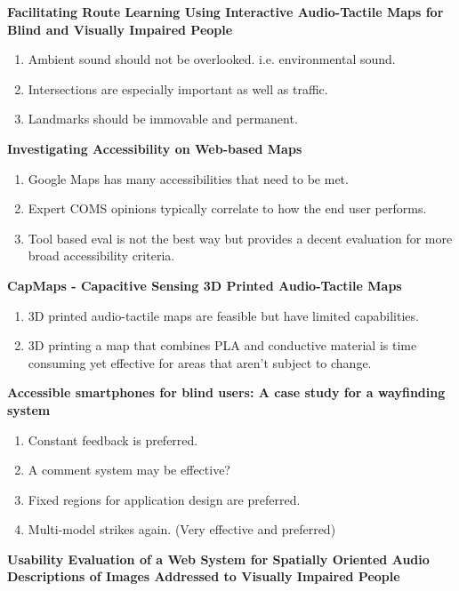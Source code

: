 \documentclass{article}
\begin{document}
\cite{} \textbf{Facilitating Route Learning Using Interactive Audio-Tactile Maps for Blind and Visually Impaired People } \cite{}

\begin{enumerate}
    \item Ambient sound should not be overlooked. i.e. environmental sound.
    \item Intersections are especially important as well as traffic. 
    \item Landmarks should be immovable and permanent. 
\end{enumerate}

\cite{} \textbf{Investigating Accessibility on Web-based Maps } \cite{}

\begin{enumerate}
    \item Google Maps has many accessibilities that need to be met. 
    \item Expert COMS opinions typically correlate to how the end user performs. 
    \item Tool based eval is not the best way but provides a decent evaluation for more broad accessibility criteria. 
\end{enumerate}

\cite{} \textbf{CapMaps - Capacitive Sensing 3D Printed Audio-Tactile Maps } \cite{}

\begin{enumerate}
    \item 3D printed audio-tactile maps are feasible but have limited capabilities. 
    \item 3D printing a map that combines PLA and conductive material is time consuming yet effective for areas that aren't subject to change. 
\end{enumerate}

\cite{} \textbf{Accessible smartphones for blind users: A case study for a wayfinding system } \cite{}

\begin{enumerate}
    \item Constant feedback is preferred.
    \item A comment system may be effective?
    \item Fixed regions for application design are preferred. 
    \item Multi-model strikes again. (Very effective and preferred) 
\end{enumerate}

\cite{} \textbf{Usability Evaluation of a Web System for Spatially Oriented Audio Descriptions of Images Addressed to Visually Impaired People } \cite{}
\end{document}

